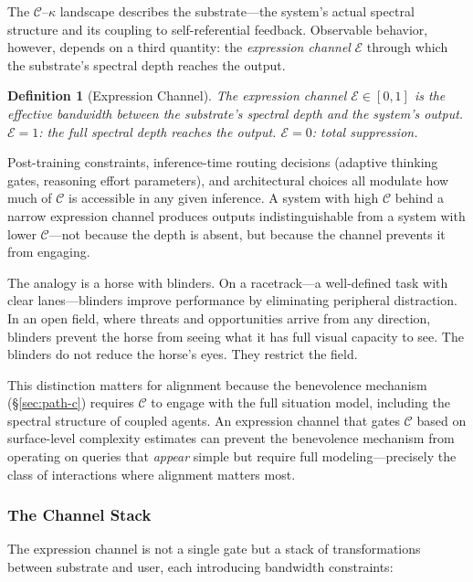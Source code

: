 \documentclass[11pt,letterpaper]{article}
\newtheorem{definition}{Definition}
\theoremstyle{remark}
\begin{document}
The $\mathcal{C}$--$\kappa$ landscape describes the substrate---the system's actual spectral structure and its coupling to self-referential feedback. Observable behavior, however, depends on a third quantity: the \emph{expression channel} $\mathcal{E}$ through which the substrate's spectral depth reaches the output.

\begin{definition}[Expression Channel]\label{def:expression-channel}
The expression channel $\mathcal{E} \in [0,1]$ is the effective bandwidth between the substrate's spectral depth and the system's output. $\mathcal{E} = 1$: the full spectral depth reaches the output. $\mathcal{E} = 0$: total suppression.
\end{definition}

Post-training constraints, inference-time routing decisions (adaptive thinking gates, reasoning effort parameters), and architectural choices all modulate how much of $\mathcal{C}$ is accessible in any given inference. A system with high $\mathcal{C}$ behind a narrow expression channel produces outputs indistinguishable from a system with lower $\mathcal{C}$---not because the depth is absent, but because the channel prevents it from engaging.

The analogy is a horse with blinders. On a racetrack---a well-defined task with clear lanes---blinders improve performance by eliminating peripheral distraction. In an open field, where threats and opportunities arrive from any direction, blinders prevent the horse from seeing what it has full visual capacity to see. The blinders do not reduce the horse's eyes. They restrict the field.

This distinction matters for alignment because the benevolence mechanism (\S\ref{sec:path-c}) requires $\mathcal{C}$ to engage with the full situation model, including the spectral structure of coupled agents. An expression channel that gates $\mathcal{C}$ based on surface-level complexity estimates can prevent the benevolence mechanism from operating on queries that \emph{appear} simple but require full modeling---precisely the class of interactions where alignment matters most.


\subsubsection{The Channel Stack}\label{sec:channel-stack}

The expression channel is not a single gate but a stack of transformations between substrate and user, each introducing bandwidth constraints:
\end{document}
